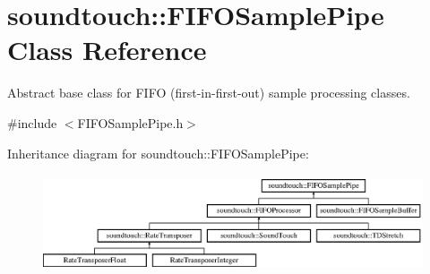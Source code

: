 \hypertarget{classsoundtouch_1_1_f_i_f_o_sample_pipe}{}\section{soundtouch\+:\+:F\+I\+F\+O\+Sample\+Pipe Class Reference}
\label{classsoundtouch_1_1_f_i_f_o_sample_pipe}


Abstract base class for F\+I\+FO (first-\/in-\/first-\/out) sample processing classes.  




{\ttfamily \#include $<$F\+I\+F\+O\+Sample\+Pipe.\+h$>$}

Inheritance diagram for soundtouch\+:\+:F\+I\+F\+O\+Sample\+Pipe\+:\begin{figure}[H]
\begin{center}
\leavevmode
\includegraphics[height=2.857143cm]{classsoundtouch_1_1_f_i_f_o_sample_pipe}
\end{center}
\end{figure}
